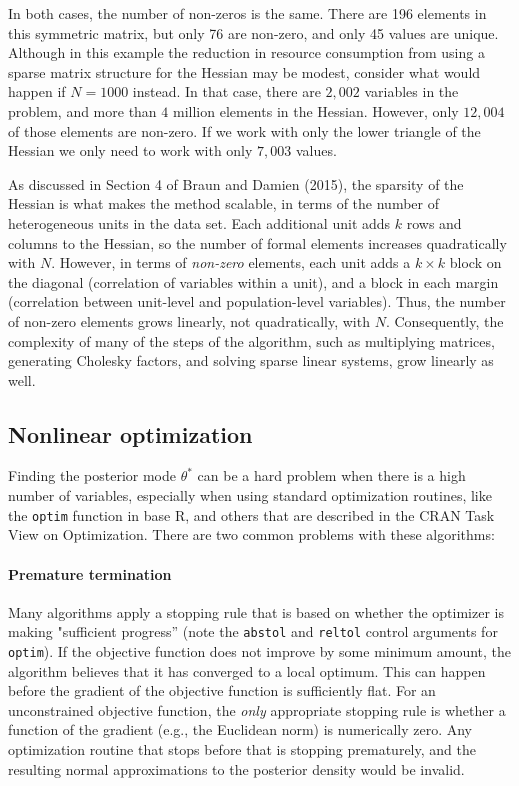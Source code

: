 \documentclass[10pt]{article}\usepackage[]{graphicx}\usepackage[]{color}
\newcommand{\proglang}[1]{\textsf{#1}}
\newcommand{\func}[1]{\texttt{#1}}
\newcommand{\funcarg}[1]{\texttt{#1}}
\begin{document}
In both cases, the number of non-zeros is the same.  There are
196 elements in this symmetric matrix, but only  76 are
non-zero, and only 45 values are unique.  Although in this
example the reduction in
resource consumption from using a sparse matrix structure for the Hessian may be
modest, consider what would happen if $N=1000$ instead.  In that case,
there are $2,002$
variables in the problem, and more than $4$ million
elements in the Hessian.  However, only $12,004$ of those elements are
non-zero.  If we work with only the lower triangle of the Hessian we
only need to work with
only $7,003$ values.

As discussed in Section 4 of Braun and Damien (2015), the sparsity of
the Hessian is what makes the method scalable, in terms of the number
of heterogeneous units in the data set.  Each additional unit
adds $k$ rows and columns to the Hessian, so the number of formal
elements increases quadratically with $N$.  However, in terms of
\emph{non-zero} elements, each unit adds a $k\times k$ block on the
diagonal (correlation of variables within a unit), and a block in each
margin (correlation between unit-level and population-level
variables).  Thus, the number of non-zero elements grows linearly, not
quadratically, with $N$.  Consequently, the complexity of many of the steps of the
algorithm, such as multiplying matrices, generating Cholesky factors,
and solving sparse linear systems, grow linearly as well.


\subsection{Nonlinear optimization}\label{sec:optimization}

Finding the posterior mode $\theta^*$ can be a hard problem when there
is a high number of variables, especially when using standard
optimization routines, like the \func{optim} function in base
\proglang{R}, and others that are described in the CRAN Task View on
Optimization.  There are two common problems with these algorithms:

\paragraph{Premature termination}  Many algorithms apply a stopping rule that is based on
whether the optimizer is making "sufficient progress'' (note the
\funcarg{abstol} and \funcarg{reltol} control arguments for \func{optim}). If the
objective function does not improve by some minimum amount, the
algorithm believes that it has converged to a local optimum. This can happen before the gradient of the
objective function is sufficiently flat.  For an unconstrained objective
function, the \emph{only} appropriate stopping rule is whether a
function of the gradient (e.g., the Euclidean norm) is numerically
zero.  Any optimization routine that stops before that is stopping
prematurely, and the resulting normal approximations to the
posterior density would be invalid.
\end{document}
